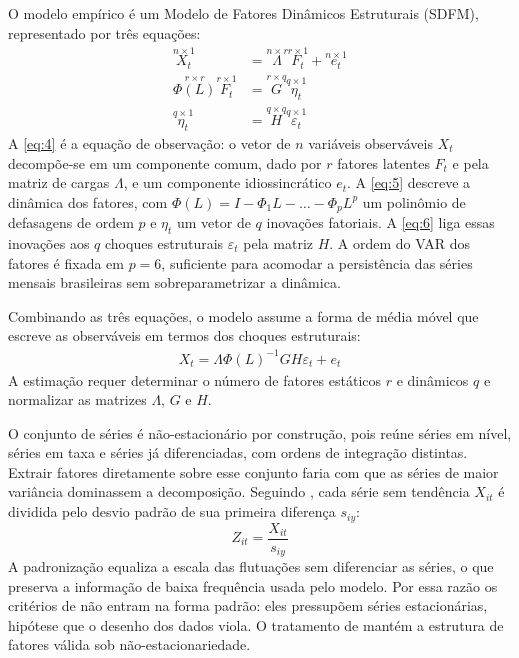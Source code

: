 \documentclass[
article,			%
12pt,				%
oneside,			%
a4paper,			%
hidelinks, 
english,			%
brazil,				%
]{abntex2}
\theoremstyle{plain}
\theoremstyle{definition}
\theoremstyle{remark}
\begin{document}
O modelo empírico é um Modelo de Fatores Dinâmicos Estruturais (SDFM), representado por três equações:
\begin{align}
    \overset{n\times 1}{X_t} &= \overset{n\times r}{\Lambda} \overset{r\times 1}{F_t} + \overset{n\times 1}{e_t}\label{eq:4}\\[4pt]
    \overset{r\times r}{\Phi(L)}\overset{r\times 1}{F_t} &= \overset{r\times q}{G} \overset{q\times 1}{\eta_t} \label{eq:5}\\[4pt]
    \overset{q\times 1}{\eta_t} &= \overset{q\times q}{H} \overset{q\times 1}{\varepsilon_t} \label{eq:6}
\end{align}
A \cref{eq:4} é a equação de observação: o vetor de $n$ variáveis observáveis $X_t$ decompõe-se em um componente comum, dado por $r$ fatores latentes $F_t$ e pela matriz de cargas $\Lambda$, e um componente idiossincrático $e_t$. A \cref{eq:5} descreve a dinâmica dos fatores, com $\Phi(L) = I - \Phi_1 L - \dots - \Phi_p L^p$ um polinômio de defasagens de ordem $p$ e $\eta_t$ um vetor de $q$ inovações fatoriais. A \cref{eq:6} liga essas inovações aos $q$ choques estruturais $\varepsilon_t$ pela matriz $H$. A ordem do VAR dos fatores é fixada em $p = 6$, suficiente para acomodar a persistência das séries mensais brasileiras sem sobreparametrizar a dinâmica.

Combinando as três equações, o modelo assume a forma de média móvel que escreve as observáveis em termos dos choques estruturais:
\begin{align}\label{eq:7}
    X_t=\Lambda \Phi(L)^{-1}GH\varepsilon_t + e_t
\end{align}
A estimação requer determinar o número de fatores estáticos $r$ e dinâmicos $q$ e normalizar as matrizes $\Lambda$, $G$ e $H$.

O conjunto de séries é não-estacionário por construção, pois reúne séries em nível, séries em taxa e séries já diferenciadas, com ordens de integração distintas. Extrair fatores diretamente sobre esse conjunto faria com que as séries de maior variância dominassem a decomposição. Seguindo , cada série sem tendência $X_{it}$ é dividida pelo desvio padrão de sua primeira diferença $s_{iy}$:
\begin{equation}
    Z_{it} = \frac{X_{it}}{s_{iy}}
\end{equation}
A padronização equaliza a escala das flutuações sem diferenciar as séries, o que preserva a informação de baixa frequência usada pelo modelo. Por essa razão os critérios de  não entram na forma padrão: eles pressupõem séries estacionárias, hipótese que o desenho dos dados viola. O tratamento de  mantém a estrutura de fatores válida sob não-estacionariedade.
\end{document}
